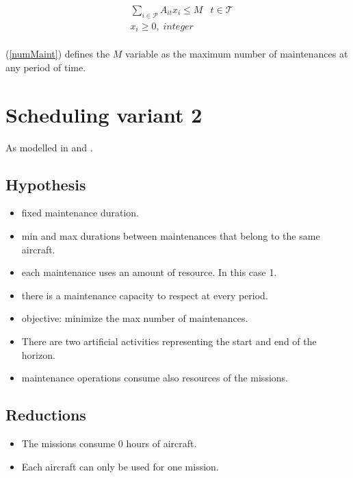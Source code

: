 \documentclass[a4paper,11pt]{article}
\begin{document}
    \begin{align}
        & \sum_{i \in \mathcal{P}} A_{it}x_{i} \leq M & t \in \mathcal{T} \label{numMaint} \\
        & x_{i} \geq 0,\; integer \\
    \end{align}

        (\ref{numMaint}) defines the $M$ variable as the maximum number of maintenances at any period of time.


\clearpage

\section{Scheduling variant 2}

    As modelled in \cite{Rieck2012} and \cite{Neumann2000}.

    \subsection{Hypothesis}

    \begin{itemize}
     \item fixed maintenance duration.
     \item min and max durations between maintenances that belong to the same aircraft.
     \item each maintenance uses an amount of resource. In this case 1.
     \item there is a maintenance capacity to respect at every period.
     \item objective: minimize the max number of maintenances.
     \item There are two artificial activities representing the start and end of the horizon.
     \item maintenance operations consume also resources of the missions.
    \end{itemize}

    \subsection{Reductions}

    \begin{itemize}
        \item The missions consume 0 hours of aircraft.
        \item Each aircraft can only be used for one mission.
    \end{itemize}
\end{document}
